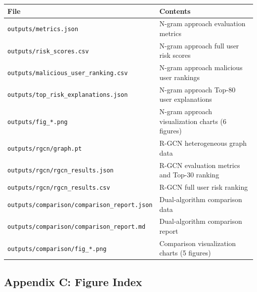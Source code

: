 \documentclass[
  a4paper,
  11pt]{article}
\newcounter{none} %
\begin{document}
{\def\LTcaptype{none} %
\begin{longtable}[]{@{}ll@{}}
\toprule\noalign{}
File & Contents \\
\midrule\noalign{}
\endhead
\bottomrule\noalign{}
\endlastfoot
\texttt{outputs/metrics.json} & N-gram approach evaluation metrics \\
\texttt{outputs/risk\_scores.csv} & N-gram approach full user risk
scores \\
\texttt{outputs/malicious\_user\_ranking.csv} & N-gram approach
malicious user rankings \\
\texttt{outputs/top\_risk\_explanations.json} & N-gram approach Top-80
user explanations \\
\texttt{outputs/fig\_*.png} & N-gram approach visualization charts (6
figures) \\
\texttt{outputs/rgcn/graph.pt} & R-GCN heterogeneous graph data \\
\texttt{outputs/rgcn/rgcn\_results.json} & R-GCN evaluation metrics and
Top-30 ranking \\
\texttt{outputs/rgcn/rgcn\_results.csv} & R-GCN full user risk
ranking \\
\texttt{outputs/comparison/comparison\_report.json} & Dual-algorithm
comparison data \\
\texttt{outputs/comparison/comparison\_report.md} & Dual-algorithm
comparison report \\
\texttt{outputs/comparison/fig\_*.png} & Comparison visualization charts
(5 figures) \\
\end{longtable}
}

\subsection{Appendix C: Figure Index}\label{appendix-c-figure-index}
\end{document}

